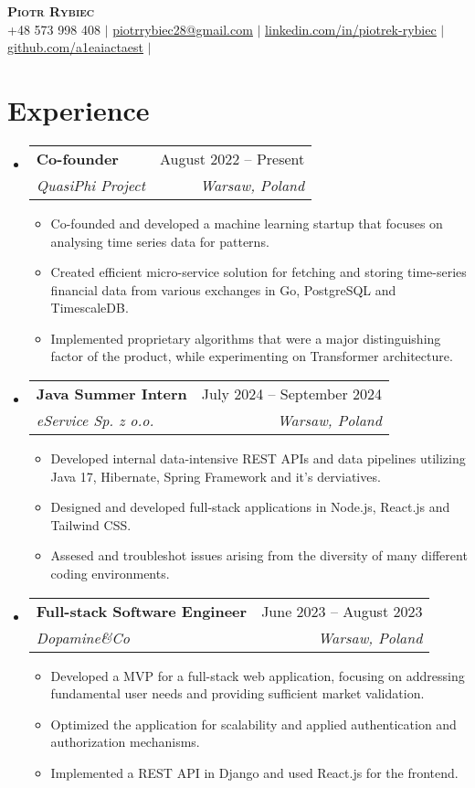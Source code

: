 \documentclass[letterpaper,11pt]{article}
\makeatletter
\newcommand{\resumeItem}[1]{
  \item\small{
    {#1 \vspace{-2pt}}
  }
}
\newcommand{\resumeSubheading}[4]{
  \vspace{-2pt}\item
    \begin{tabular*}{0.97\textwidth}[t]{l@{\extracolsep{\fill}}r}
      \textbf{#1} & #2 \\
      \textit{\small#3} & \textit{\small #4} \\
    \end{tabular*}\vspace{-7pt}
}
\newcommand{\resumeSubHeadingListStart}{\begin{itemize}[leftmargin=0.15in, label={}]}
\newcommand{\resumeSubHeadingListEnd}{\end{itemize}}
\newcommand{\resumeItemListStart}{\begin{itemize}}
\newcommand{\resumeItemListEnd}{\end{itemize}\vspace{-5pt}}
\makeatother
\begin{document}
\begin{center}
  \textbf{\Huge \scshape Piotr Rybiec} \\ \vspace{1pt}
  \small +48 573 998 408 $|$ \href{mailto:piotrrybiec28@gmail.com}{\underline{piotrrybiec28@gmail.com}} $|$
  \href{https://linkedin.com/in/piotrek-rybiec}{\underline{linkedin.com/in/piotrek-rybiec}} $|$
  \href{https://github.com/a1eaiactaest}{\underline{github.com/a1eaiactaest}} $|$
\end{center}

\section{Experience}
  \resumeSubHeadingListStart
    \resumeSubheading
      {Co-founder}{August 2022 -- Present}
      {QuasiPhi Project}{Warsaw, Poland}
      \resumeItemListStart
        \resumeItem{Co-founded and developed a machine learning startup that focuses on analysing time series data for patterns.}
        \resumeItem{Created efficient micro-service solution for fetching and storing time-series financial data from various exchanges in Go, PostgreSQL and TimescaleDB.}
        \resumeItem{Implemented proprietary algorithms that were a major distinguishing factor of the product, while experimenting on Transformer architecture.}
      \resumeItemListEnd
    \resumeSubheading
      {Java Summer Intern}{July 2024 -- September 2024}
      {eService Sp. z o.o.}{Warsaw, Poland}
      \resumeItemListStart
        \resumeItem{Developed internal data-intensive REST APIs and data pipelines utilizing Java 17, Hibernate, Spring Framework and it's derviatives.}
        \resumeItem{Designed and developed full-stack applications in Node.js, React.js and Tailwind CSS.}
        \resumeItem{Assesed and troubleshot issues arising from the diversity of many different coding environments.}
      \resumeItemListEnd
    \resumeSubheading
      {Full-stack Software Engineer}{June 2023 -- August 2023}
      {Dopamine\&Co}{Warsaw, Poland}
      \resumeItemListStart
        \resumeItem{Developed a MVP for a full-stack web application, focusing on addressing fundamental user needs and providing sufficient market validation.}
        \resumeItem{Optimized the application for scalability and applied authentication and authorization mechanisms.}
        \resumeItem{Implemented a REST API in Django and used React.js for the frontend.}
      \resumeItemListEnd
  \resumeSubHeadingListEnd
\end{document}
